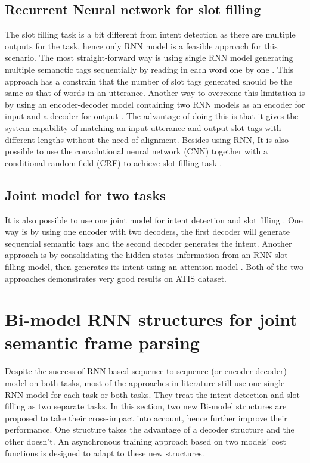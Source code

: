 \documentclass[11pt,a4paper]{article}
\begin{document}
\subsection{Recurrent Neural network for slot filling}
The slot filling task is a bit different from intent detection as there are multiple outputs for the task, hence only RNN model is a feasible approach for this scenario. The most straight-forward way is using single RNN model generating multiple semanctic tags sequentially by reading in each word one by one \cite{liu2015recurrent,mesnil2015using,peng2015recurrent}. This approach has a constrain that the number of slot tags generated should be the same as that of words in an utterance. Another way to overcome this limitation is by using an encoder-decoder model containing two RNN models as an encoder for input and a decoder for output \cite{liu2016attention}. The advantage of doing this is that it gives the system capability of matching an input utterance and output slot tags with different lengths without the need of alignment. Besides using RNN, It is also possible to use the convolutional neural network (CNN) together with a conditional random field (CRF) to achieve slot filling task \cite{xu2013convolutional}.
\subsection{Joint model for two tasks}
It is also possible to use one joint model for intent detection and slot filling \cite{guo2014joint, liu2016attention,liu2016joint,zhang2016joint,hakkani2016multi}. One way is by using one encoder with two decoders, the first decoder will generate sequential semantic tags and the second decoder generates the intent. Another approach is by consolidating the hidden states information from an RNN slot filling model, then generates its intent using an attention model \cite{liu2016attention}. Both of the two approaches demonstrates very good results on ATIS dataset. 
\section{Bi-model RNN structures for joint semantic frame parsing }
Despite the success of RNN based sequence to sequence (or encoder-decoder) model on both tasks, most of the approaches in literature still use one single RNN model for each task or both tasks. They treat the intent detection and slot filling as two separate tasks. In this section, two new Bi-model structures are proposed to take their cross-impact into account, hence further improve their performance. One structure takes the advantage of a decoder structure and the other doesn't. An asynchronous training approach based on two models' cost functions is designed to adapt to these new structures. 
\end{document}
